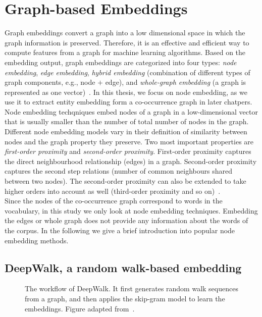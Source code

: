 \section{Graph-based Embeddings}
\label{sec:graph}
Graph embeddings convert a graph into a low dimensional space in which the graph information is preserved. Therefore, it is an effective and efficient way to compute features from a graph for machine learning algorithms. Based on the embedding output, graph embeddings are categorized into four types: \emph{node embedding}, \emph{edge embedding}, \emph{hybrid embedding} (combination of different types of graph components, e.g., node $+$ edge), and  \emph{whole-graph embedding} (a graph is represented as one vector)~. In this thesis, we focus on node embedding, as we use it to extract entity embedding form a co-occurrence graph in later chatpers. Node embedding techqniques embed nodes of a graph in a low-dimensional vector that is usually smaller than the number of total number of nodes in the graph. Different node embedding models vary in their definition of similarity between nodes and the graph property they preserve. Two most important properties are \emph{first-order proximity} and \emph{second-order proximity}. First-order proximity captures the direct neighbourhood relationship (edges) in a graph. Second-order proximity captures the second step relations (number of common neighbours shared between two nodes). The second-order proximity can also be extended to take higher orders into account as well (third-order proximity and so on)~.\\
Since the nodes of the co-occurrence graph correspond to words in the vocabulary, in this study we only look at node embedding techniques. Embedding the edges or whole graph does not provide any information about the words of the corpus. In the following we give a brief introduction into popular node embedding methods. 
\subsection{DeepWalk, a random walk-based embedding}
\label{subsec:DeepWalk}
\begin{figure}
\centering 
\resizebox{0.8\textwidth}{0.35\textwidth}{      

}
\caption{The workflow of DeepWalk. It first generates random walk sequences from a graph, and then applies the skip-gram model to learn the embeddings. Figure adapted from~.}
\label{fig:deepwalk}
\end{figure}

